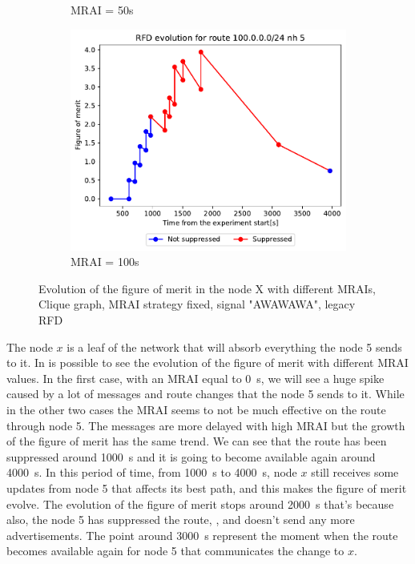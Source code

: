 \begin{figure}[h]
\begin{subfigure}[b]{0.49\textwidth}
         \caption{MRAI = 50s}
         \label{fig:clique_x_mrai50}
     \end{subfigure}
     \begin{subfigure}[b]{0.49\textwidth}
         \centering
         \includegraphics[width=\textwidth]{images/RFD/clique/FigureOfMerit/mrai21_RFD_x_rfd_R1.pdf}
         \caption{MRAI = 100s}
         \label{fig:clique_x_mrai100}
     \end{subfigure}
        \caption{Evolution of the figure of merit in the node X with different MRAIs,
		Clique graph, MRAI strategy fixed, signal "AWAWAWA", legacy RFD}
        \label{fig:clique_nodex}
\end{figure}

The node $x$ is a leaf of the network that will absorb everything the node \num{5}
sends to it.
In  is possible to see the evolution of the figure of merit
with different \ac{MRAI} values.
In the first case, with an \ac{MRAI} equal to \SI{0}{\second}, we will see a huge
spike caused by a lot of messages and route changes that the node \num{5} sends
to it.
While in the other two cases 
the \ac{MRAI} seems to not be much effective on the route through node \num{5}.
The messages are more delayed with high \ac{MRAI} but the growth of the figure
of merit has the same trend.
We can see that the route has been suppressed around \SI{1000}{\second}
and it is going to become available again around \SI{4000}{\second}.
In this period of time, from \SI{1000}{\second} to \SI{4000}{\second}, node $x$ still
receives some updates from node \num{5} that affects its best path, and this
makes the figure of merit evolve.
The evolution of the figure of merit stops around \SI{2000}{\second} that's because
also, the node \num{5} has suppressed the route, , and
doesn't send any more advertisements.
The point around \SI{3000}{\second} represent the moment when the route becomes
available again for node \num{5} that communicates the change to $x$.

